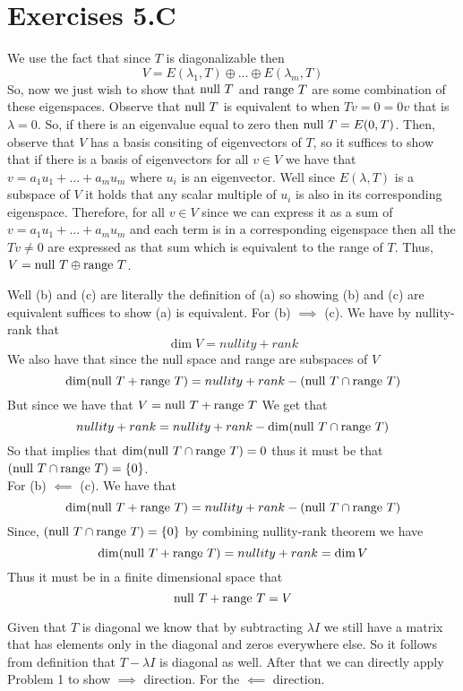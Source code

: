 \documentclass[10pt, twocolumn]{article}
\begin{document}
\section{Exercises 5.C}
\begin{q}[1]
    We use the fact that since $ T $ is diagonalizable then 
    $$ V = E(\lambda_1, T) \oplus ... \oplus E(\lambda_m, T) $$
    So, now we just wish to show that $ \text{null } T $ and $ \text{range } T $ are some combination of these eigenspaces.
    Observe that $ \text{null } T $ is equivalent to when $ Tv = 0 = 0v $ that is $ \lambda = 0 $. 
    So, if there is an eigenvalue equal to zero then $ \text{null } T = E(0, T) $.
    Then, observe that $ V $ has a basis consiting of eigenvectors of $ T $, so it suffices to show that if there is a basis of eigenvectors 
    for all $ v \in V $ we have that $ v = a_1u_1 + ... + a_m u_m $ where $ u_i $ is an eigenvector. 
    Well since $ E(\lambda, T ) $ is a subspace of $ V $ it holds that any scalar multiple of $ u_i $ is also in its corresponding eigenspace.
    Therefore, for all $ v \in V $ since we can express it as a sum of $ v = a_1 u_1 + ... + a_m u_m $ and each term is in a corresponding eigenspace 
    then all the $ Tv \neq 0 $ are expressed as that sum which is equivalent to the range of $ T $. 
    Thus, $ V = \text{null } T \oplus \text{range } T $. 
\end{q}
\begin{q}[3]
    Well (b) and (c) are literally the definition of (a) so showing (b) and (c) are equivalent suffices to show (a) is equivalent.
    For (b) $ \implies $ (c). 
    We have by nullity-rank that 
    $$ \dim V = nullity + rank $$
    We also have that since the null space and range are subspaces of $ V $
    $$ \dim (\text{null } T + \text{range } T) = nullity + rank - (\text{null } T \cap \text{range } T) $$
    But since we have that $ V = \text{null } T + \text{range } T $ We get that
    $$ nullity + rank = nullity + rank - \dim (\text{null } T \cap \text{range } T) $$
    So that implies that $\dim (\text{null } T \cap \text{range } T) = 0 $ thus it must be that $ (\text{null } T \cap \text{range } T) = \{0\} $. \\
    For (b) $ \impliedby $ (c). 
    We have that 
    $$ \dim (\text{null } T + \text{range } T) = nullity + rank - (\text{null } T \cap \text{range } T)$$
    Since, $ (\text{null } T \cap \text{range } T) = \{0\} $
    by combining nullity-rank theorem we have 
    $$ \dim (\text{null } T + \text{range } T) = nullity + rank = \dim V$$
    Thus it must be in a finite dimensional space that
    $$ \text{null } T +\text{range } T = V $$
\end{q}
\begin{q}[5]
    Given that $ T $ is diagonal we know that by subtracting $ \lambda I $ we still have a matrix that has elements only in the diagonal and zeros everywhere else. 
    So it follows from definition that $ T - \lambda I $ is diagonal as well. After that we can directly apply Problem 1 to show $ \implies $ direction.
    For the $ \impliedby $ direction. 
\end{q}
\end{document}
